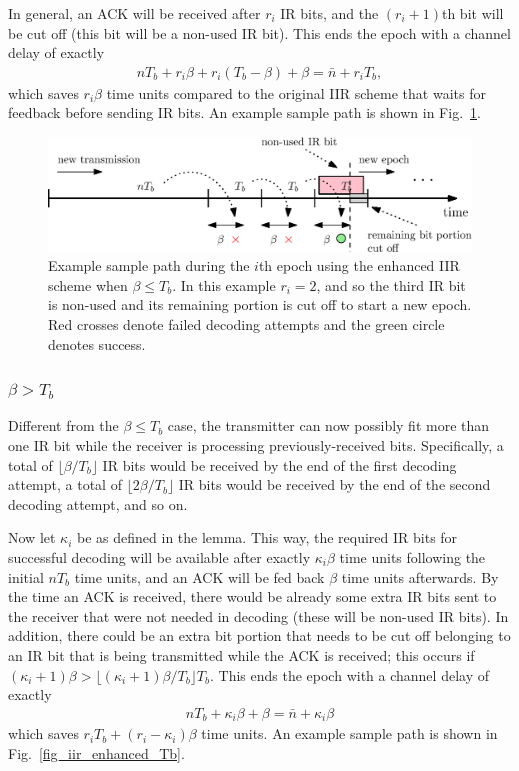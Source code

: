 \documentclass[12pt,journal,onecolumn]{IEEEtran}
\begin{document}
In general, an ACK will be received after $r_i$ IR bits, and the $(r_i+1)$th bit will be cut off (this bit will be a non-used IR bit). This ends the epoch with a channel delay of exactly
\begin{align}
nT_b+r_i\beta+r_i(T_b-\beta)+\beta=\bar{n}+r_iT_b,
\end{align}
which saves $r_i\beta$ time units compared to the original IIR scheme that waits for feedback before sending IR bits. An example sample path is shown in Fig.~\ref{fig_iir_enhanced_beta}.

\begin{figure}[t]
\center
\includegraphics[scale=.5]{iir_enhanced_beta}
\caption{Example sample path during the $i$th epoch using the enhanced IIR scheme when $\beta\leq T_b$. In this example $r_i=2$, and so the third IR bit is non-used and its remaining portion is cut off to start a new epoch. Red crosses denote failed decoding attempts and the green circle denotes success.}
\label{fig_iir_enhanced_beta}
\end{figure}

\subsubsection{$\beta>T_b$}

Different from the $\beta\leq T_b$ case, the transmitter can now possibly fit more than one IR bit while the receiver is processing previously-received bits. Specifically, a total of $\lfloor\beta/T_b\rfloor$ IR bits would be received by the end of the first decoding attempt, a total of $\lfloor2\beta/T_b\rfloor$ IR bits would be received by the end of the second decoding attempt, and so on.

Now let $\kappa_i$ be as defined in the lemma. This way, the required IR bits for successful decoding will be available after exactly $\kappa_i\beta$ time units following the initial $nT_b$ time units, and an ACK will be fed back $\beta$ time units afterwards. By the time an ACK is received, there would be already some extra IR bits sent to the receiver that were not needed in decoding (these will be non-used IR bits). In addition, there could be an extra bit portion that needs to be cut off belonging to an IR bit that is being transmitted while the ACK is received; this occurs if $(\kappa_i+1)\beta>\lfloor(\kappa_i+1)\beta/T_b\rfloor T_b$. This ends the epoch with a channel delay of exactly
\begin{align}
nT_b+\kappa_i\beta+\beta=\bar{n}+\kappa_i\beta
\end{align}
which saves $r_iT_b+(r_i-\kappa_i)\beta$ time units. An example sample path is shown in Fig.~\ref{fig_iir_enhanced_Tb}.
\end{document}
